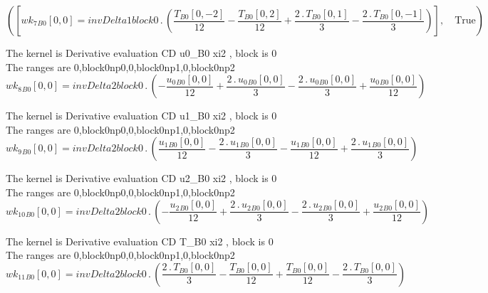 \documentclass{article}
\begin{document}
\begin{dmath}\left ( \left [ {wk_{7}{_{B0}}}[{0,0}] = invDelta1block0 \,.\, \left(\frac{{T{_{B0}}}[{0,-2}]}{12} - \frac{{T{_{B0}}}[{0,2}]}{12} + \frac{2 \,.\, {T{_{B0}}}[{0,1}]}{3} - \frac{2 \,.\, {T{_{B0}}}[{0,-1}]}{3}\right)\right ], \quad 
\mathrm{True}\right )\end{dmath}

\noindent The kernel is Derivative evaluation CD u0_B0 xi2 , block is 0\\\noindent The ranges are 0,block0np0,0,block0np1,0,block0np2\\\begin{dmath}{wk_{8}{_{B0}}}[{0,0}] = invDelta2block0 \,.\, \left(- \frac{{u_{0}{_{B0}}}[{0,0}]}{12} + \frac{2 \,.\, {u_{0}{_{B0}}}[{0,0}]}{3} - \frac{2 \,.\, {u_{0}{_{B0}}}[{0,0}]}{3} + \frac{{u_{0}{_{B0}}}[{0,0}]}{12}\right)\end{dmath}

\noindent The kernel is Derivative evaluation CD u1_B0 xi2 , block is 0\\\noindent The ranges are 0,block0np0,0,block0np1,0,block0np2\\\begin{dmath}{wk_{9}{_{B0}}}[{0,0}] = invDelta2block0 \,.\, \left(\frac{{u_{1}{_{B0}}}[{0,0}]}{12} - \frac{2 \,.\, {u_{1}{_{B0}}}[{0,0}]}{3} - \frac{{u_{1}{_{B0}}}[{0,0}]}{12} + \frac{2 \,.\, {u_{1}{_{B0}}}[{0,0}]}{3}\right)\end{dmath}

\noindent The kernel is Derivative evaluation CD u2_B0 xi2 , block is 0\\\noindent The ranges are 0,block0np0,0,block0np1,0,block0np2\\\begin{dmath}{wk_{10}{_{B0}}}[{0,0}] = invDelta2block0 \,.\, \left(- \frac{{u_{2}{_{B0}}}[{0,0}]}{12} + \frac{2 \,.\, {u_{2}{_{B0}}}[{0,0}]}{3} - \frac{2 \,.\, {u_{2}{_{B0}}}[{0,0}]}{3} + \frac{{u_{2}{_{B0}}}[{0,0}]}{12}\right)\end{dmath}

\noindent The kernel is Derivative evaluation CD T_B0 xi2 , block is 0\\\noindent The ranges are 0,block0np0,0,block0np1,0,block0np2\\\begin{dmath}{wk_{11}{_{B0}}}[{0,0}] = invDelta2block0 \,.\, \left(\frac{2 \,.\, {T{_{B0}}}[{0,0}]}{3} - \frac{{T{_{B0}}}[{0,0}]}{12} + \frac{{T{_{B0}}}[{0,0}]}{12} - \frac{2 \,.\, {T{_{B0}}}[{0,0}]}{3}\right)\end{dmath}
\end{document}
